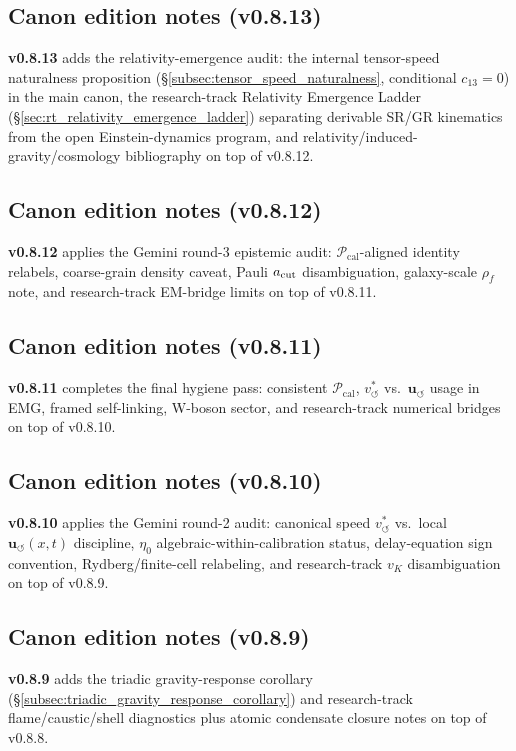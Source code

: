 \documentclass[11pt]{article}
\theoremstyle{definition}
\theoremstyle{plain}
\theoremstyle{remark}
\newcommand{\rhoF}{{\rho_{\!f}}}
\newcommand{\vchar}{v_{\!\boldsymbol{\circlearrowleft}}^{\ast}}
\newcommand{\uswirl}{\mathbf{u}_{\!\boldsymbol{\circlearrowleft}}}
\begin{document}
        \subsection{Canon edition notes (v0.8.13)}
            \textbf{v0.8.13} adds the relativity-emergence audit: the internal tensor-speed naturalness proposition (\S\ref{subsec:tensor_speed_naturalness}, conditional $c_{13}=0$) in the main canon, the research-track Relativity Emergence Ladder (\S\ref{sec:rt_relativity_emergence_ladder}) separating derivable SR/GR kinematics from the open Einstein-dynamics program, and relativity/induced-gravity/cosmology bibliography on top of v0.8.12.

        \subsection{Canon edition notes (v0.8.12)}
            \textbf{v0.8.12} applies the Gemini round-3 epistemic audit: $\mathcal{P}_{\mathrm{cal}}$-aligned identity relabels, coarse-grain density caveat, Pauli $a_{\rm cut}$ disambiguation, galaxy-scale $\rhoF$ note, and research-track EM-bridge limits on top of v0.8.11.

        \subsection{Canon edition notes (v0.8.11)}
            \textbf{v0.8.11} completes the final hygiene pass: consistent $\mathcal{P}_{\mathrm{cal}}$, $\vchar$ vs.\ $\uswirl$ usage in EMG, framed self-linking, W-boson sector, and research-track numerical bridges on top of v0.8.10.

        \subsection{Canon edition notes (v0.8.10)}
            \textbf{v0.8.10} applies the Gemini round-2 audit: canonical speed $\vchar$ vs.\ local $\uswirl(x,t)$ discipline, $\eta_0$ algebraic-within-calibration status, delay-equation sign convention, Rydberg/finite-cell relabeling, and research-track $v_K$ disambiguation on top of v0.8.9.

        \subsection{Canon edition notes (v0.8.9)}
            \textbf{v0.8.9} adds the triadic gravity-response corollary (\S\ref{subsec:triadic_gravity_response_corollary}) and research-track flame/caustic/shell diagnostics plus atomic condensate closure notes on top of v0.8.8.
\end{document}
